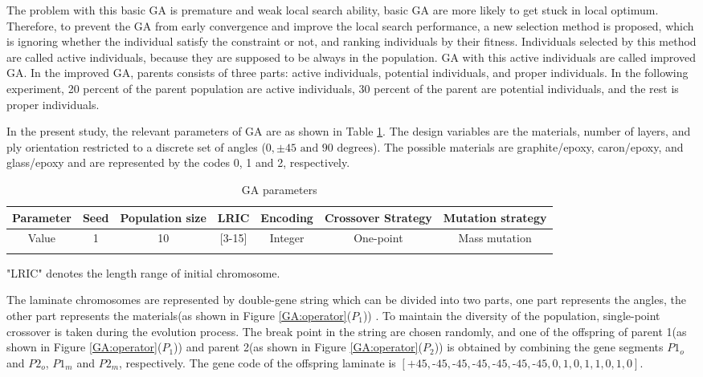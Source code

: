 \documentclass[Afour,sagev,times]{sagej}
\begin{document}
The problem with this basic GA is premature and weak local search ability, basic GA are more likely to get stuck in local
optimum. Therefore, to prevent the GA from early convergence and improve the local search
performance, a new selection method is proposed, which is ignoring whether the individual satisfy
the constraint or not, and ranking individuals by their fitness. Individuals selected by
this method are called active individuals, because they are supposed to be always in the population.
GA with this active individuals are called improved GA.
In the improved GA, parents consists of three parts: active individuals, potential 
individuals, and proper individuals. In the following experiment, 20 percent of the parent
population are active individuals, 30 percent of the parent are potential individuals, and the rest
is proper individuals.


In the present study, the relevant parameters of GA are as shown in Table \ref{tab:ga}. The design
variables are the materials, number of layers, and ply orientation restricted to a discrete set of
angles ($0,\pm 45 \text{ and } 90 \text{ degrees} $). The possible materials are graphite/epoxy,
caron/epoxy, and glass/epoxy and are represented by the codes 0, 1 and 2, respectively.

\begin{table}
\small\sf\centering
\caption{GA parameters}
\begin{tabular}{ccccccc}
	\toprule
	Parameter &  Seed &Population size & LRIC  & Encoding &  Crossover Strategy& Mutation strategy\\
	\midrule
	Value     & 1     &10               & [3-15]& Integer  &  One-point &Mass mutation   \\
	\bottomrule
	\label{tab:ga}
\end{tabular}
\end{table}
\begin{tablenotes}\footnotesize
\item{"LRIC" denotes the length range of initial chromosome.}
\end{tablenotes}


The laminate chromosomes are represented by double-gene string
which can be divided into two parts, one part represents the angles, the other
part represents the materials(as shown in Figure \ref{GA:operator}($P_1$)) . To maintain
the diversity of the population, single-point crossover is taken during the
evolution process. The break point in the string are chosen randomly, and one of the offspring of parent 1(as shown in Figure
\ref{GA:operator}($P_1$))  and parent 2(as shown in Figure \ref{GA:operator}($P_2$)) is obtained by combining the
gene segments $P1_o$ and $P2_o$, $P1_m$ and $P2_m$, respectively. The gene code of the offspring
laminate is
$[\text{+}45,\text{-}45,\text{-}45,\text{-}45,\text{-}45,\text{-}45,\text{-}45,0,1,0,1,1,0,1,0]$.
\end{document}
